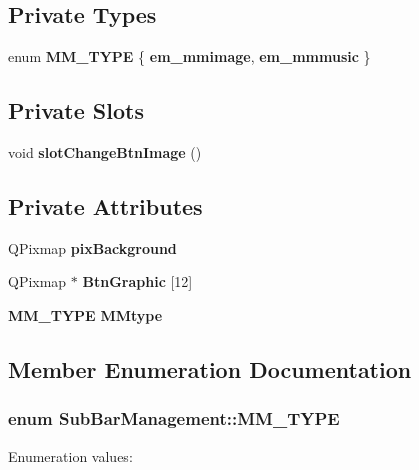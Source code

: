 \subsection*{Private Types}
\begin{CompactItemize}
\item 
enum {\bf MM\_\-TYPE} \{ {\bf em\_\-mmimage}, 
{\bf em\_\-mmmusic}
 \}
\end{CompactItemize}
\subsection*{Private Slots}
\begin{CompactItemize}
\item 
void {\bf slot\-Change\-Btn\-Image} ()
\end{CompactItemize}
\subsection*{Private Attributes}
\begin{CompactItemize}
\item 
QPixmap {\bf pix\-Background}
\item 
QPixmap $\ast$ {\bf Btn\-Graphic} [12]
\item 
{\bf MM\_\-TYPE} {\bf MMtype}
\end{CompactItemize}


\subsection{Member Enumeration Documentation}
\subsubsection{\setlength{\rightskip}{0pt plus 5cm}enum {\bf Sub\-Bar\-Management::MM\_\-TYPE}\hspace{0.3cm}{\tt  [private]}}\label{classSubBarManagement_SubBarManagementy2}


\begin{Desc}
\item[Enumeration values: ]\par
\begin{description}
\item[{\em 
em\_\-mmimage\label{classSubBarManagement_SubBarManagementy2SubBarManagementy0}
}]\item[{\em 
em\_\-mmmusic\label{classSubBarManagement_SubBarManagementy2SubBarManagementy1}
}]\end{description}
\end{Desc}



